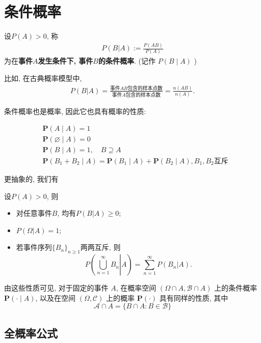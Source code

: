 \section{条件概率}

\begin{definition}
    设$P(A)>0$, 称
    \begin{align*}
        P(B|A):=\frac{P(AB)}{P(A)}
    \end{align*}
    为在\textbf{事件$A$发生条件下, 事件$B$的条件概率}. (记作 $P(B \mid A)$ )
\end{definition}

比如, 在古典概率模型中, 
\begin{align*}
    P(B|A)=\frac{\mbox{事件$AB$包含的样本点数}}{\mbox{事件$A$包含的样本点数}}=\frac{n(AB)}{n(A)}.
\end{align*}

条件概率也是概率, 因此它也具有概率的性质:

$$
\begin{aligned}
& \mathbf{P}(A \mid A)=1 \\
& \mathbf{P}(\varnothing \mid A)=0 \\
& \mathbf{P}(B \mid A)=1, \quad B \supseteq A \\
& \mathbf{P}\left(B_1+B_2 \mid A\right)=\mathbf{P}\left(B_1 \mid A\right)+\mathbf{P}\left(B_2 \mid A\right), B_1,B_2\text{互斥}
\end{aligned}
$$

更抽象的, 我们有

\begin{proposition}
    设$P(A)>0$, 则
    \begin{itemize}
        \item 对任意事件$B$, 均有$P(B|A)\ge 0$; 
        \item $P(\Omega|A)=1$; 
        \item 若事件序列$\{B_n\}_{n\ge 1}$两两互斥, 则
              $$P\left( \left. \bigcup_{n=1}^{\infty} B_n \right| A\right)=\sum_{n=1}^{\infty} P(B_n|A).$$
    \end{itemize}
\end{proposition}

由这些性质可见, 对于固定的事件 $A$, 在概率空间 $(\Omega \cap A, \mathscr{B} \cap A)$ 上的条件概率 $\mathbf{P}(\cdot \mid A)$, 以及在空间 $(\Omega, \mathscr{C})$ 上的概率 $\mathbf{P}(\cdot)$ 具有同样的性质, 其中
$$
\mathscr{A} \cap A=\{B \cap A: B \in \mathscr{B}\}
$$

\subsection*{全概率公式}


